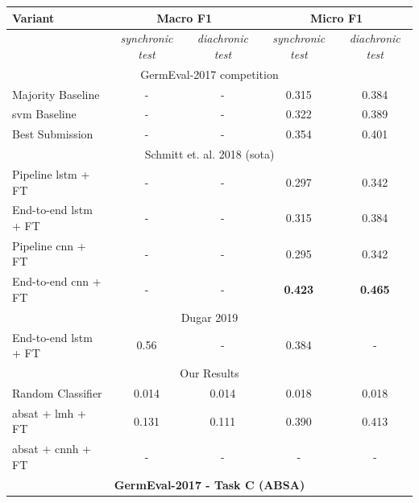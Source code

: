 \begin{table}[htp]
	\centering
	\begin{tabular*}{\textwidth}{l@{\extracolsep{\fill}}cccc@{}}
	\toprule
	Variant          & \multicolumn{2}{c}{\textbf{Macro F1}}     & \multicolumn{2}{c}{\textbf{Micro F1}}       \\ 
	\midrule
					 & \textit{synchronic test}      	& \textit{diachronic test} 		& \textit{synchronic test}      		& \textit{diachronic test} 		\\
	\midrule
								 \multicolumn{5}{c}{GermEval-2017 competition \cite{Wojatzki2017}} 					\\
	Majority Baseline        		 &  -        	&  -    	& 0.315        	&   0.384 							\\
	\gls{svm} Baseline        		 &  -        	&  -    	& 0.322        	&   0.389 							\\
	Best Submission 				 &  - 			&  - 		& 0.354 		& 0.401 							\\
	\midrule
								 \multicolumn{5}{c}{Schmitt et. al. 2018 {(\gls{sota})} \cite{Schmitt2018}} 		\\
	Pipeline \gls{lstm} + FT 		 & -        	& -    		& 0.297     	&   0.342							\\
	End-to-end \gls{lstm} + FT 		 & -        	& -    		& 0.315     	&   0.384 							\\
	Pipeline \gls{cnn} + FT 		 & -        	& -    		& 0.295     	&   0.342 							\\
	End-to-end \gls{cnn} + FT 		 & -        	& -    		& \textbf{0.423}&   \textbf{0.465} 					\\
	\midrule
	\multicolumn{5}{c}{Dugar 2019 \cite{Dugar2019}} 													\\
	End-to-end \gls{lstm} + FT 		 & 0.56        	& -    		&  0.384 &   - 					\\
	\midrule

								 \multicolumn{5}{c}{Our Results} 													\\

	Random Classifier          		 &  0.014   	& 0.014 	&  0.018  		&   0.018  							\\
	\gls{absat} + \gls{lmh} + FT     & 0.131        & 0.111		&  0.390    	&   0.413   							\\ 
	\gls{absat} + \gls{cnnh} + FT    & -         	& -			&  -        	&   -   							\\ 
	\bottomrule
	\multicolumn{5}{c}{\textbf{GermEval-2017 - Task C {(ABSA)}}} \\


\end{tabular*}
\end{table}
